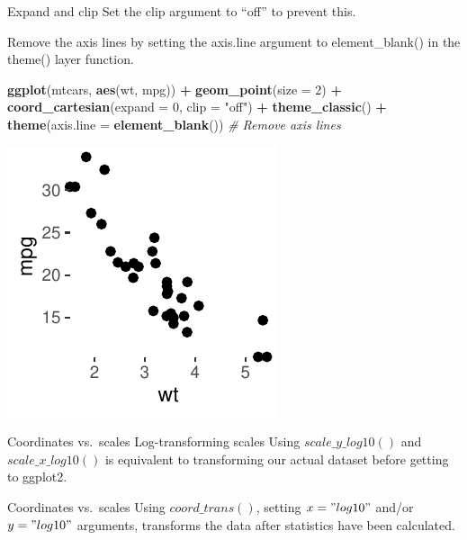 \documentclass[
  ignorenonframetext,
]{beamer}
\newenvironment{Shaded}{\begin{snugshade}}{\end{snugshade}}
\newcommand{\AttributeTok}[1]{\textcolor[rgb]{0.13,0.29,0.53}{#1}}
\newcommand{\CommentTok}[1]{\textcolor[rgb]{0.56,0.35,0.01}{\textit{#1}}}
\newcommand{\DecValTok}[1]{\textcolor[rgb]{0.00,0.00,0.81}{#1}}
\newcommand{\FunctionTok}[1]{\textcolor[rgb]{0.13,0.29,0.53}{\textbf{#1}}}
\newcommand{\NormalTok}[1]{#1}
\newcommand{\SpecialCharTok}[1]{\textcolor[rgb]{0.81,0.36,0.00}{\textbf{#1}}}
\newcommand{\StringTok}[1]{\textcolor[rgb]{0.31,0.60,0.02}{#1}}
\begin{document}
\begin{frame}[fragile]{Expand and clip}
\label{expand-and-clip-4}
Set the clip argument to ``off'' to prevent this.

Remove the axis lines by setting the axis.line argument to
element\_blank() in the theme() layer function.


\begin{Shaded}
\begin{Highlighting}[]
\FunctionTok{ggplot}\NormalTok{(mtcars, }\FunctionTok{aes}\NormalTok{(wt, mpg)) }\SpecialCharTok{+} \FunctionTok{geom\_point}\NormalTok{(}\AttributeTok{size =} \DecValTok{2}\NormalTok{) }\SpecialCharTok{+} \FunctionTok{coord\_cartesian}\NormalTok{(}\AttributeTok{expand =} \DecValTok{0}\NormalTok{,}
    \AttributeTok{clip =} \StringTok{"off"}\NormalTok{) }\SpecialCharTok{+} \FunctionTok{theme\_classic}\NormalTok{() }\SpecialCharTok{+} \FunctionTok{theme}\NormalTok{(}\AttributeTok{axis.line =} \FunctionTok{element\_blank}\NormalTok{())  }\CommentTok{\# Remove axis lines}
\end{Highlighting}
\end{Shaded}

\begin{center}\includegraphics[width=0.5\linewidth]{Figs/unnamed-chunk-47-1} \end{center}
\end{frame}

\begin{frame}{Coordinates vs.~scales}
\label{coordinates-vs.-scales}
Log-transforming scales Using \(scale\_y\_log10()\) and
\(scale\_x\_log10()\) is equivalent to transforming our actual dataset
before getting to ggplot2.
\end{frame}

\begin{frame}{Coordinates vs.~scales}
\label{coordinates-vs.-scales-1}
Using \(coord\_trans()\), setting \(x = "log10"\) and/or \(y = "log10"\)
arguments, transforms the data after statistics have been calculated.
\end{frame}
\end{document}
